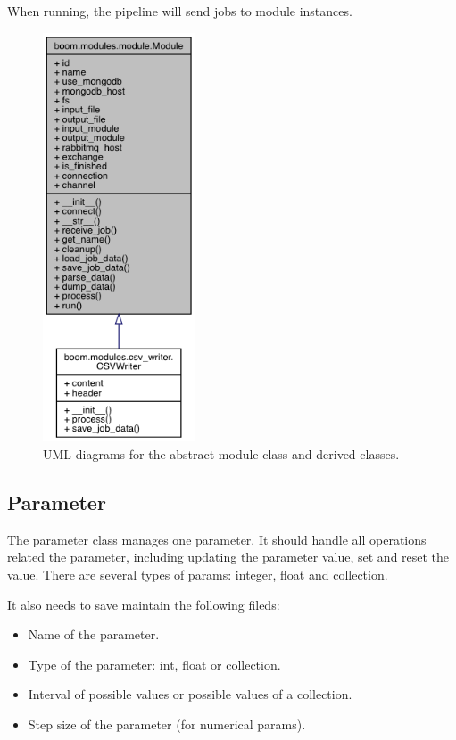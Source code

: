 \documentclass{article}
\begin{document}
    When running, the pipeline will send jobs to module instances.

    \begin{figure}[H]
        \begin{center}
            \includegraphics[width=0.4\textwidth]{fig/module_uml.png}
        \end{center}
        \label{fig:module_uml}
        \caption{UML diagrams for the abstract module class and derived classes.}
    \end{figure}

    \subsection{Parameter}
    \label{sec:parameter}
    The parameter class manages one parameter.
    It should handle all operations related the parameter,
    including updating the parameter value,
    set and reset the value.
    There are several types of params: integer, float and collection.

    It also needs to save maintain the following fileds:
    \begin{itemize}
        \item Name of the parameter.
        \item Type of the parameter: int, float or collection.
        \item Interval of possible values or possible values of a collection.
        \item Step size of the parameter (for numerical params).
    \end{itemize}
\end{document}
